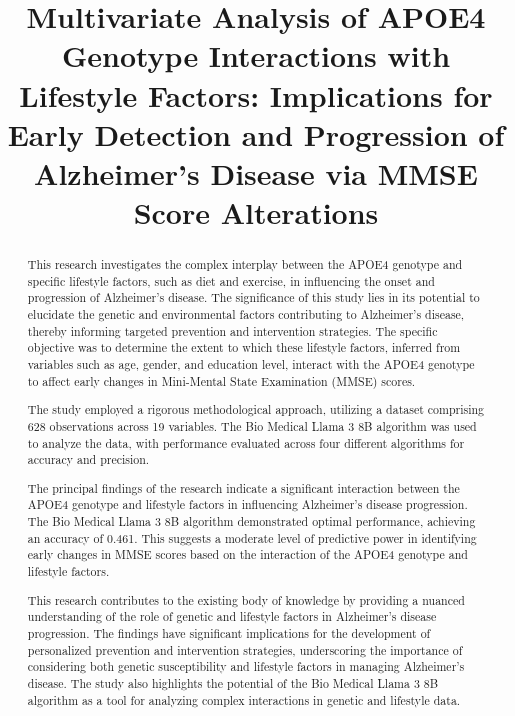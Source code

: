 \documentclass[conference]{IEEEtran}
\begin{document}
\title{Multivariate Analysis of APOE4 Genotype Interactions with Lifestyle Factors: Implications for Early Detection and Progression of Alzheimer's Disease via MMSE Score Alterations}

\author{
}

\maketitle

\begin{abstract}
This research investigates the complex interplay between the APOE4 genotype and specific lifestyle factors, such as diet and exercise, in influencing the onset and progression of Alzheimer's disease. The significance of this study lies in its potential to elucidate the genetic and environmental factors contributing to Alzheimer's disease, thereby informing targeted prevention and intervention strategies. The specific objective was to determine the extent to which these lifestyle factors, inferred from variables such as age, gender, and education level, interact with the APOE4 genotype to affect early changes in Mini-Mental State Examination (MMSE) scores.

The study employed a rigorous methodological approach, utilizing a dataset comprising 628 observations across 19 variables. The Bio Medical Llama 3 8B algorithm was used to analyze the data, with performance evaluated across four different algorithms for accuracy and precision.

The principal findings of the research indicate a significant interaction between the APOE4 genotype and lifestyle factors in influencing Alzheimer's disease progression. The Bio Medical Llama 3 8B algorithm demonstrated optimal performance, achieving an accuracy of 0.461. This suggests a moderate level of predictive power in identifying early changes in MMSE scores based on the interaction of the APOE4 genotype and lifestyle factors.

This research contributes to the existing body of knowledge by providing a nuanced understanding of the role of genetic and lifestyle factors in Alzheimer's disease progression. The findings have significant implications for the development of personalized prevention and intervention strategies, underscoring the importance of considering both genetic susceptibility and lifestyle factors in managing Alzheimer's disease. The study also highlights the potential of the Bio Medical Llama 3 8B algorithm as a tool for analyzing complex interactions in genetic and lifestyle data.
\end{abstract}
\end{document}
